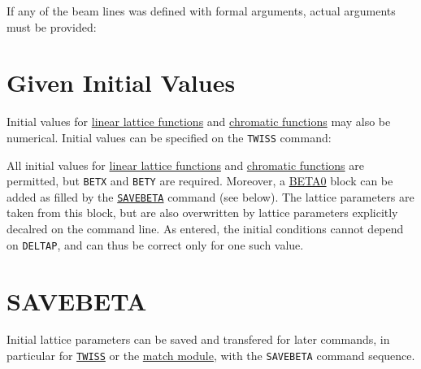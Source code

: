 If any of the beam lines was defined with formal arguments, actual
arguments must be provided:  

\section{Given Initial Values}

Initial values for \hyperref[subsec:tables-linear]{linear
lattice functions} and \hyperref[subsec:tables-chrom]{chromatic
  functions} may also be numerical.
Initial values can be specified on the \texttt{TWISS} command:  

All initial values for
\hyperref[subsec:tables-linear]{linear lattice functions} and
\hyperref[subsec:tables-chrom]{chromatic functions} are
permitted, but \texttt{BETX} and \texttt{BETY} are required.
Moreover, a \hyperref[sec:beta0]{BETA0} block can be added as filled by the
\hyperref[sec:savebeta]{\texttt{SAVEBETA}} command (see below).
The lattice parameters are taken from this block, but are also
overwritten by lattice parameters explicitly decalred on the command 
line. As entered, the initial conditions cannot depend on
\texttt{DELTAP},
and can thus be correct only for one such value.  

\section{SAVEBETA}
\label{sec:savebeta}
Initial lattice parameters can be saved and transfered for later commands, in
particular for \hyperref[chap:twiss]{\texttt{TWISS}} or the
\hyperref[chap:match]{match module}, with the \texttt{SAVEBETA} command
sequence.   

